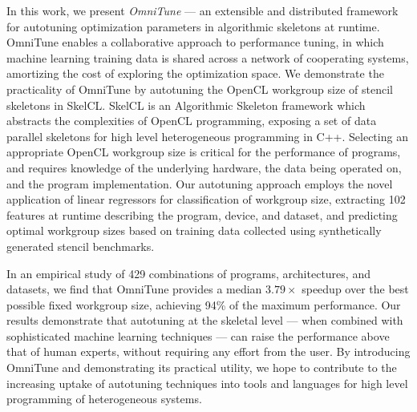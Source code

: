 In this work, we present \textit{OmniTune} --- an extensible and
distributed framework for autotuning optimization parameters in
algorithmic skeletons at runtime. OmniTune enables a collaborative
approach to performance tuning, in which machine learning training
data is shared across a network of cooperating systems, amortizing the
cost of exploring the optimization space. We demonstrate the
practicality of OmniTune by autotuning the OpenCL workgroup size of
stencil skeletons in SkelCL. SkelCL is an Algorithmic Skeleton
framework which abstracts the complexities of OpenCL programming,
exposing a set of data parallel skeletons for high level heterogeneous
programming in C++. Selecting an appropriate OpenCL workgroup size is
critical for the performance of programs, and requires knowledge of
the underlying hardware, the data being operated on, and the program
implementation. Our autotuning approach employs the novel application
of linear regressors for classification of workgroup size, extracting
102 features at runtime describing the program, device, and dataset,
and predicting optimal workgroup sizes based on training data
collected using synthetically generated stencil benchmarks.

In an empirical study of 429 combinations of programs, architectures,
and datasets, we find that OmniTune provides a median $3.79\times$
speedup over the best possible fixed workgroup size, achieving 94\% of
the maximum performance. Our results demonstrate that autotuning at
the skeletal level --- when combined with sophisticated machine
learning techniques --- can raise the performance above that of human
experts, without requiring any effort from the user. By introducing
OmniTune and demonstrating its practical utility, we hope to
contribute to the increasing uptake of autotuning techniques into
tools and languages for high level programming of heterogeneous
systems.

\newpage



\newpage





